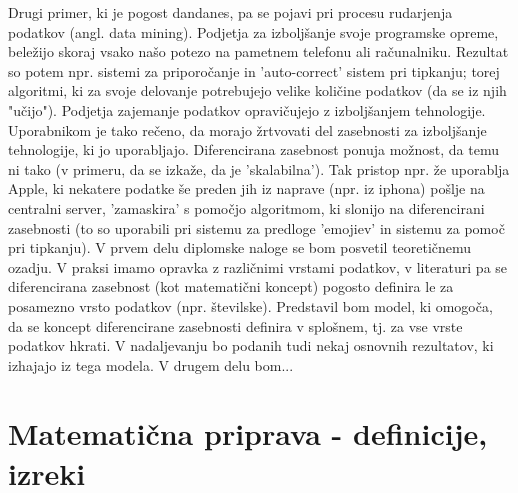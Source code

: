 \documentclass[mat1]{article}
\theoremstyle{definition}
\begin{document}
\newline
\newline
Drugi primer, ki je pogost dandanes, pa se pojavi pri procesu rudarjenja podatkov (angl. data mining). Podjetja za izboljšanje svoje programske opreme, beležijo skoraj vsako našo potezo na pametnem telefonu ali računalniku. Rezultat so potem npr. sistemi za priporočanje in 'auto-correct' sistem pri tipkanju; torej algoritmi, ki za svoje delovanje potrebujejo velike količine podatkov (da se iz njih "učijo"). Podjetja zajemanje podatkov opravičujejo z izboljšanjem tehnologije. Uporabnikom je tako rečeno, da morajo žrtvovati del zasebnosti za izboljšanje tehnologije, ki jo uporabljajo. Diferencirana zasebnost ponuja možnost, da temu ni tako (v primeru, da se izkaže, da je 'skalabilna'). Tak pristop npr. že uporablja Apple, ki nekatere podatke še preden jih iz naprave (npr. iz iphona) pošlje na centralni server, 'zamaskira' s pomočjo algoritmom, ki slonijo na diferencirani zasebnosti (to so uporabili pri sistemu za predloge 'emojiev' in sistemu za pomoč pri tipkanju). 
\newline
\newline
V prvem delu diplomske naloge se bom posvetil teoretičnemu ozadju. V praksi imamo opravka z različnimi vrstami podatkov, v literaturi pa se diferencirana zasebnost (kot matematični koncept) pogosto definira le za posamezno vrsto podatkov (npr. številske). Predstavil bom model, ki omogoča, da se koncept diferencirane zasebnosti definira v splošnem, tj. za vse vrste podatkov hkrati. V nadaljevanju bo podanih tudi nekaj osnovnih rezultatov, ki izhajajo iz tega modela. V drugem delu bom...

\section{Matematična priprava - definicije, izreki}
\end{document}
